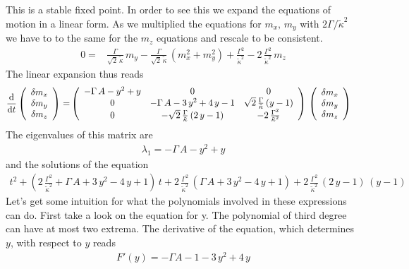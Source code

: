 \documentclass{article}
\begin{document}
This is a stable fixed point. In order to see this we expand the equations of motion in a linear form. As we multiplied the equations for $m_x,\,m_y$ with $2\Gamma/\tilde{\kappa}^2$ we have to to the same for the $m_z$ equations and rescale to be consistent. 
\begin{align*}
    0=&\frac{\Gamma}{\sqrt{2}\,\tilde{\kappa}}\,m_y  - \frac{\Gamma}{\sqrt{2}\,\tilde{\kappa}}\,(m_x^2+ m_y^2)+\frac{\Gamma^2}{\tilde{\kappa}^2}-2\,\frac{\Gamma^2}{\tilde{\kappa}^2}\,m_z
\end{align*}
The linear expansion thus reads
\begin{align*}
    \frac{\text{d}}{\text{d}t}\left(\begin{array}{c}
         \delta m_x\\
         \delta m_y\\
         \delta m_z
    \end{array}\right)=&\left( \begin{array}{ccc}
        -\Gamma\,A-y^2+y&  0 & 0\\
        0 & -\Gamma\,A-3\,y^2+4\,y-1 & \sqrt{2}\,\frac{\Gamma}{\tilde{\kappa}}\,(y-1)\\
        0 &  -\sqrt{2}\,\frac{\Gamma}{\tilde{\kappa}}\,(2\,y-1) & -2\,\frac{\Gamma^2}{\tilde{\kappa}^2}
    \end{array} \right)\,\left(\begin{array}{c}
         \delta m_x\\
         \delta m_y\\
         \delta m_z
    \end{array}\right)
\end{align*}
The eigenvalues of this matrix are
\begin{align*}
     \lambda_1=-\Gamma\,A-y^2+y
\end{align*}
and the solutions of the equation
\begin{align*}
    t^2+\left( 2\,\frac{\Gamma^2}{\tilde{\kappa}^2}+\Gamma\,A+3\,y^2-4\,y+1  \right)\,t+2\,\frac{\Gamma^2}{\tilde{\kappa}^2}\,\left( \Gamma\,A+3\,y^2-4\,y+1 \right)+2\,\frac{\Gamma^2}{\tilde{\kappa}^2}\,(2\,y-1)\,(y-1)
\end{align*}
Let's get some intuition for what the polynomials involved in these expressions can do. First take a look on the equation for y. The polynomial of third degree can have at most two extrema. The derivative of the equation, which determines $y$, with respect to $y$ reads
\begin{align*}
    F'(y)=-\Gamma A-1 -3\,y^2+4\,y
\end{align*}
\end{document}
